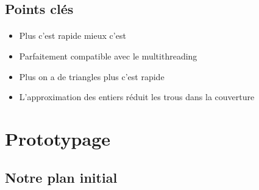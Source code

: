 \subsection{Points clés}

\begin{frame}[fragile=singleslide]{\insertsectionhead}
  \framesubtitle{\insertsubsectionhead}
  \begin{itemize}
      \item Plus c'est rapide mieux c'est
      \item Parfaitement compatible avec le multithreading
      \item Plus on a de triangles plus c'est rapide
      \item L'approximation des entiers réduit les trous dans la couverture
    \end{itemize}
    \vfill
    \begin{figure}
      \begin{subfigure}{1\textwidth}
      \end{subfigure}
    \end{figure}
    
    
\end{frame}

\section{Prototypage}

\subsection{Notre plan initial}

